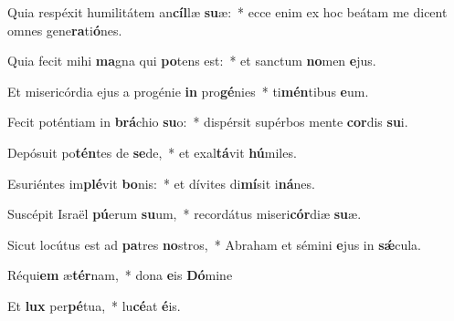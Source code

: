 ﻿\setcounter{enumi}{2}
\item Quia respéxit humilitátem an\textbf{cíl}læ \textbf{su}æ:~* ecce enim ex hoc beátam me dicent omnes gene\textbf{ra}ti\textbf{ó}nes.

\item Quia fecit mihi \textbf{ma}gna qui \textbf{po}tens est:~* et sanctum \textbf{no}men \textbf{e}jus.

\item Et misericórdia ejus a progénie \textbf{in} pro\textbf{gé}nies~* ti\textbf{mén}tibus \textbf{e}um.

\item Fecit poténtiam in \textbf{brá}chio \textbf{su}o:~* dispérsit supérbos mente \textbf{cor}dis \textbf{su}i.

\item Depósuit po\textbf{tén}tes de \textbf{se}de,~* et exal\textbf{tá}vit \textbf{hú}miles.

\item Esuriéntes im\textbf{plé}vit \textbf{bo}nis:~* et dívites di\textbf{mí}sit i\textbf{ná}nes.

\item Suscépit Israël \textbf{pú}erum \textbf{su}um,~* recordátus miseri\textbf{cór}diæ \textbf{su}æ.

\item Sicut locútus est ad \textbf{pa}tres \textbf{no}stros,~* Abraham et sémini \textbf{e}jus in \textbf{sǽ}cula.

\item Réqui\textbf{em} æ\textbf{tér}nam,~* dona \textbf{e}is \textbf{Dó}mine

\item Et \textbf{lux} per\textbf{pé}tua,~* lu\textbf{cé}at \textbf{é}is.

